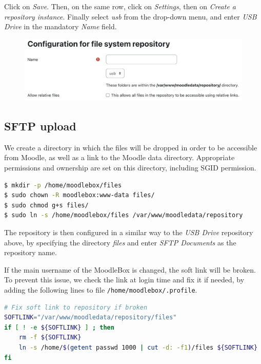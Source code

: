 \documentclass[12pt]{article}
\begin{document}
Click on \emph{Save}.
Then, on the same row, click on \emph{Settings}, then on \emph{Create a repository instance}.
Finally select \emph{usb} from the drop-down menu, and enter \emph{USB Drive} in the mandatory \emph{Name} field.
\begin{figure}[!ht]
\begin{minipage}[b]{\linewidth}\centering
\includegraphics[width=13cm]{repo-filesystem-usb-2.png}
\end{minipage}
\end{figure}

\subsection{SFTP upload}

We create a directory in which the files will be dropped in order to be accessible from Moodle, as well as a link to the Moodle data directory.
Appropriate permissions and ownership are set on this directory, including SGID permission.

\begin{lstlisting}[language=bash]
$ mkdir -p /home/moodlebox/files
$ sudo chown -R moodlebox:www-data files/
$ sudo chmod g+s files/
$ sudo ln -s /home/moodlebox/files /var/www/moodledata/repository
\end{lstlisting}

The repository is then configured in a similar way to the \textsl{USB Drive} repository above, by specifying the directory \emph{files} and enter \emph{SFTP Documents} as the repository name.

If the main username of the MoodleBox is changed, the soft link will be broken.
To prevent this issue, we check the link at login time and fix it if needed, by adding the following lines to file \lstinline{/home/moodlebox/.profile}.

\begin{lstlisting}[language=bash]
# Fix soft link to repository if broken
SOFTLINK="/var/www/moodledata/repository/files"
if [ ! -e ${SOFTLINK} ] ; then
    rm -f ${SOFTLINK}
    ln -s /home/$(getent passwd 1000 | cut -d: -f1)/files ${SOFTLINK}
fi
\end{lstlisting}
\end{document}
